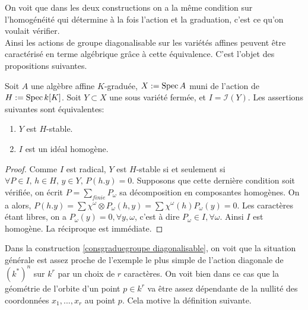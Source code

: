 \begin{cons}
\begin{multicols}{2}
	\columnbreak
	\begin{center}
	\end{center}
\end{multicols}
\end{cons}

On voit que dans les deux constructions on a la même condition sur l'homogénéité qui détermine à la fois l'action et la graduation, c'est ce qu'on voulait vérifier.\\
Ainsi les actions de groupe diagonalisable sur les variétés affines peuvent être caractérisé en terme algébrique  grâce à cette équivalence. C'est l'objet des propositions suivantes.

\begin{prop}\label{stablehomogene}
Soit $A$ une algèbre affine $K$-graduée, $X:=\operatorname{Spec} A$ muni de l'action de $H:=\operatorname{Spec} k[K]$.  Soit $Y\subset X$ une sous variété fermée, et $I=\mathcal{I}(Y)$. Les assertions suivantes sont équivalentes:
\begin{enumerate}
\item $Y$ est $H$-stable.
\item $I$ est un idéal homogène.
\end{enumerate}
\end{prop}
\begin{proof}
Comme $I$ est radical, $Y$ est $H$-stable si et seulement si $\forall P\in I,\,h\in H,\, y\in Y,\, P(h.y)=0$. Supposons que cette dernière condition soit vérifiée, on écrit $P=\sum_{finie}P_\omega$ sa décomposition en composantes homogènes. On a alors, $P(h.y)=\sum \chi^{\omega}\otimes P_{\omega}(h,y) = \sum \chi^{\omega}(h) P_{\omega}(y)=0$. Les caractères étant libres, on a $P_{\omega}(y)=0, \forall y,\omega$, c'est à dire $P_{\omega}\in I, \forall \omega$. Ainsi $I$ est homogène. La réciproque est immédiate. 
\end{proof}

Dans la construction \ref{consgraduegroupe diagonalisable}, on voit que la situation générale est assez proche de l'exemple le plus simple de l'action diagonale de $(k^*)^n$ sur $k^r$ par un choix de $r$ caractères. On voit bien dans ce cas que la géométrie de l'orbite d'un point $p\in k^r$ va être assez dépendante de la nullité des coordonnées $x_1,..., x_r$ au point $p$. Cela motive la définition suivante.

